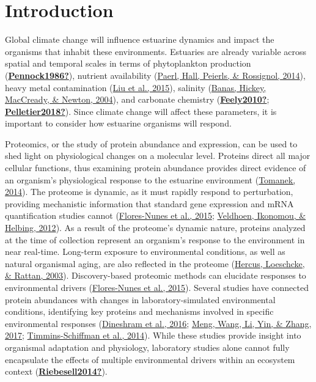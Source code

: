 \documentclass [11pt, proquest] {uwthesis}[2015/03/03]
\begin{document}
\hypertarget{introduction-1}{%
\section{Introduction}\label{introduction-1}}

Global climate change will influence estuarine dynamics and impact the organisms that inhabit these environments. Estuaries are already variable across spatial and temporal scales in terms of phytoplankton production (\protect\hyperlink{ref-Pennock1986}{\textbf{Pennock1986?}}), nutrient availability (\protect\hyperlink{ref-Paerl2014}{Paerl, Hall, Peierls, \& Rossignol, 2014}), heavy metal contamination (\protect\hyperlink{ref-Liu2015}{Liu et al., 2015}), salinity (\protect\hyperlink{ref-Banas2004}{Banas, Hickey, MacCready, \& Newton, 2004}), and carbonate chemistry (\protect\hyperlink{ref-Feely2010}{\textbf{Feely2010?}}; \protect\hyperlink{ref-Pelletier2018}{\textbf{Pelletier2018?}}). Since climate change will affect these parameters, it is important to consider how estuarine organisms will respond.

Proteomics, or the study of protein abundance and expression, can be used to shed light on physiological changes on a molecular level. Proteins direct all major cellular functions, thus examining protein abundance provides direct evidence of an organism's physiological response to the estuarine environment (\protect\hyperlink{ref-Tomanek2014}{Tomanek, 2014}). The proteome is dynamic, as it must rapidly respond to perturbation, providing mechanistic information that standard gene expression and mRNA quantification studies cannot (\protect\hyperlink{ref-Flores-Nunes2015}{Flores-Nunes et al., 2015}; \protect\hyperlink{ref-Veldhoen2012}{Veldhoen, Ikonomou, \& Helbing, 2012}). As a result of the proteome's dynamic nature, proteins analyzed at the time of collection represent an organism's response to the environment in near real-time. Long-term exposure to environmental conditions, as well as natural organismal aging, are also reflected in the proteome (\protect\hyperlink{ref-Hercus2003}{Hercus, Loeschcke, \& Rattan, 2003}). Discovery-based proteomic methods can elucidate responses to environmental drivers (\protect\hyperlink{ref-Flores-Nunes2015}{Flores-Nunes et al., 2015}). Several studies have connected protein abundances with changes in laboratory-simulated environmental conditions, identifying key proteins and mechanisms involved in specific environmental responses (\protect\hyperlink{ref-Dineshram2016}{Dineshram et al., 2016}; \protect\hyperlink{ref-Meng2017}{Meng, Wang, Li, Yin, \& Zhang, 2017}; \protect\hyperlink{ref-Timmins-Schiffman2014}{Timmins-Schiffman et al., 2014}). While these studies provide insight into organismal adaptation and physiology, laboratory studies alone cannot fully encapsulate the effects of multiple environmental drivers within an ecosystem context (\protect\hyperlink{ref-Riebesell2014}{\textbf{Riebesell2014?}}).
\end{document}
